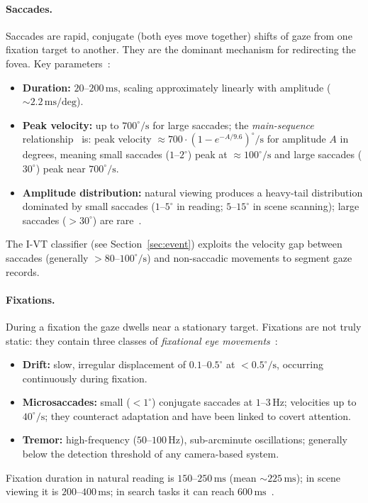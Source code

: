 \documentclass[11pt,a4paper]{article}
\begin{document}
\paragraph{Saccades.}
Saccades are rapid, conjugate (both eyes move together) shifts of gaze from one fixation target to another.
They are the dominant mechanism for redirecting the fovea.
Key parameters~\cite{rayner1998eye}:
\begin{itemize}
  \item \textbf{Duration:} $20$--$200\,\text{ms}$, scaling approximately linearly with amplitude (${\sim}2.2\,\text{ms/deg}$).
  \item \textbf{Peak velocity:} up to $700^\circ/\text{s}$ for large saccades; the \emph{main-sequence} relationship~\cite{bahill1975main} is: peak velocity $\approx 700 \cdot (1 - e^{-A/9.6})^\circ/\text{s}$ for amplitude $A$ in degrees, meaning small saccades ($1$--$2^\circ$) peak at $\approx100^\circ/\text{s}$ and large saccades ($30^\circ$) peak near $700^\circ/\text{s}$.
  \item \textbf{Amplitude distribution:} natural viewing produces a heavy-tail distribution dominated by small saccades ($1$--$5^\circ$ in reading; $5$--$15^\circ$ in scene scanning); large saccades ($>30^\circ$) are rare~\cite{yarbus1967eye}.
\end{itemize}
The I-VT classifier (see Section~\ref{sec:event}) exploits the velocity gap between saccades (generally $>80$--$100^\circ/\text{s}$) and non-saccadic movements to segment gaze records.

\paragraph{Fixations.}
During a fixation the gaze dwells near a stationary target.
Fixations are not truly static: they contain three classes of \textit{fixational eye movements}~\cite{martinez2004role}:
\begin{itemize}
  \item \textbf{Drift:} slow, irregular displacement of $0.1$--$0.5^\circ$ at $<0.5^\circ/\text{s}$, occurring continuously during fixation.
  \item \textbf{Microsaccades:} small ($<1^\circ$) conjugate saccades at $1$--$3\,\text{Hz}$; velocities up to $40^\circ/\text{s}$; they counteract adaptation and have been linked to covert attention.
  \item \textbf{Tremor:} high-frequency ($50$--$100\,\text{Hz}$), sub-arcminute oscillations; generally below the detection threshold of any camera-based system.
\end{itemize}
Fixation duration in natural reading is $150$--$250\,\text{ms}$ (mean ${\sim}225\,\text{ms}$); in scene viewing it is $200$--$400\,\text{ms}$; in search tasks it can reach $600\,\text{ms}$~\cite{rayner1998eye}.
\end{document}
